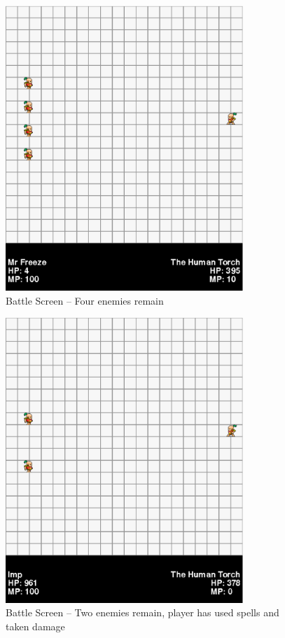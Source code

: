 \documentclass[11pt]{article}
\begin{document}
\begin{figure}[h!]
\begin{center}
\leavevmode
\includegraphics[width=0.8\textwidth]{images/battle_start}
\end{center}
\caption{Battle Screen -- Four enemies remain}
\end{figure}
\newpage

\begin{figure}[h!]
\begin{center}
\leavevmode
\includegraphics[width=0.8\textwidth]{images/battle_middle}
\end{center}
\caption{Battle Screen -- Two enemies remain, player has used spells and taken damage}
\end{figure}
\newpage
\end{document}

